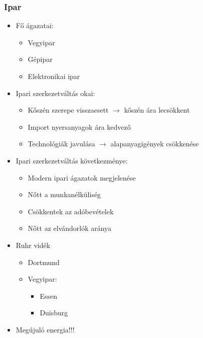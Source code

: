 \documentclass{article}
\begin{document}
\subsubsection{Ipar}
\begin{itemize}
    \item Fő ágazatai: \begin{itemize}
        \item Vegyipar
        \item Gépipar
        \item Elektronikai ipar
    \end{itemize}
    \item Ipari szerkezetváltás okai: \begin{itemize}
        \item Kőszén szerepe visszaesett $\rightarrow$ kőszén ára lecsökkent
        \item Import nyersanyagok ára kedvező
        \item Technológiák javulása $\rightarrow$ alapanyagigények csökkenése
    \end{itemize}
    \item Ipari szerkezetváltás következménye: \begin{itemize}
        \item Modern ipari ágazatok megjelenése
        \item Nőtt a munkanélküliség
        \item Csökkentek az adóbevételek
        \item Nőtt az elvándorlók aránya
    \end{itemize}

    \item Ruhr vidék \begin{itemize}
        \item Dortmund
        \item Vegyipar: \begin{itemize}
            \item Essen
            \item Duisburg
        \end{itemize}
    \end{itemize}

    \item Megújuló energia!!!
\end{itemize}
\end{document}
